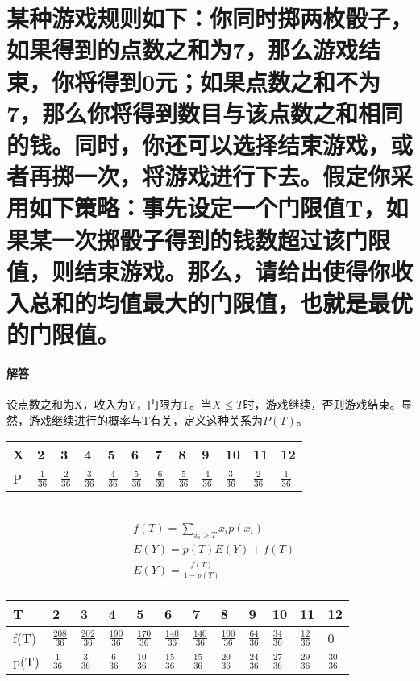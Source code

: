 \documentclass[UTF8]{ctexart}
\begin{document}
\section{某种游戏规则如下：你同时掷两枚骰子，如果得到的点数之和为7，那么游戏结束，你将得到0元；如果点数之和不为7，那么你将得到数目与该点数之和相同的钱。同时，你还可以选择结束游戏，或者再掷一次，将游戏进行下去。假定你采用如下策略：事先设定一个门限值T，如果某一次掷骰子得到的钱数超过该门限值，则结束游戏。那么，请给出使得你收入总和的均值最大的门限值，也就是最优的门限值。}
\paragraph{解答}
设点数之和为X，收入为Y，门限为T。当$X\leq T$时，游戏继续，否则游戏结束。显然，游戏继续进行的概率与T有关，定义这种关系为$P(T)$。

\begin{tabular}{|l|l|l|l|l|l|l|l|l|l|l|l|}
\hline
X&2&3&4&5&6&7&8&9&10&11&12\\
\hline
P& $\frac{1}{36}$ & $\frac{2}{36}$ & $\frac{3}{36}$ & $\frac{4}{36}$ 
& $\frac{5}{36}$ & $\frac{6}{36}$ & $\frac{5}{36}$ & $\frac{4}{36}$ 
& $\frac{3}{36}$ & $\frac{2}{36}$ & $\frac{1}{36}$\\
\hline
\end{tabular}
\\
\begin{equation*}
\begin{aligned}
&f(T)=\sum\limits_{x_i>T}x_ip(x_i)\\
&E(Y)=p(T)E(Y)+f(T)\\
&E(Y)=\frac{f(T)}{1-p(T)}\\
\end{aligned}
\end{equation*}
\begin{tabular}{|l|l|l|l|l|l|l|l|l|l|l|l|}
\hline
T&2&3&4&5&6&7&8&9&10&11&12\\
\hline
f(T)& $\frac{208}{36}$ & $\frac{202}{36}$ & $\frac{190}{36}$ & 
$\frac{170}{36}$ & $\frac{140}{36}$ & $\frac{140}{36}$ & $\frac{100}{36}$ & $\frac{64}{36}$ & $\frac{34}{36}$ & $\frac{12}{36}$ &0\\
\hline
p(T)& $\frac{1}{36}$ & $\frac{3}{36}$ & $\frac{6}{36}$ & $\frac{10}{36}$ & 
$\frac{15}{36}$ & $\frac{15}{36}$ & $\frac{20}{36}$ & $\frac{24}{36}$ &
$\frac{27}{36}$ & $\frac{29}{36}$ & $\frac{30}{36}$\\
\hline
\end{tabular}
\\
\end{document}
